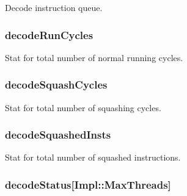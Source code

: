 \label{classDefaultDecode_a7860fc5736574343c9e294cb2bef9d93}
Decode instruction queue. \hypertarget{classDefaultDecode_af217607d5162d70e22d1892d3b7f041d}{
\subsubsection[{decodeRunCycles}]{ {\bf decodeRunCycles}}}
\label{classDefaultDecode_af217607d5162d70e22d1892d3b7f041d}
Stat for total number of normal running cycles. \hypertarget{classDefaultDecode_aac9ee4c2600bd9d9915595c7008652ba}{
\subsubsection[{decodeSquashCycles}]{ {\bf decodeSquashCycles}}}
\label{classDefaultDecode_aac9ee4c2600bd9d9915595c7008652ba}
Stat for total number of squashing cycles. \hypertarget{classDefaultDecode_a7bd44f968f6e156e212a8c275066ec40}{
\subsubsection[{decodeSquashedInsts}]{ {\bf decodeSquashedInsts}}}
\label{classDefaultDecode_a7bd44f968f6e156e212a8c275066ec40}
Stat for total number of squashed instructions. \hypertarget{classDefaultDecode_a1d8482258ad490dd3485ac43d127ce4d}{
\subsubsection[{decodeStatus}]{ {\bf decodeStatus}\mbox{[}Impl::MaxThreads\mbox{]}}}
